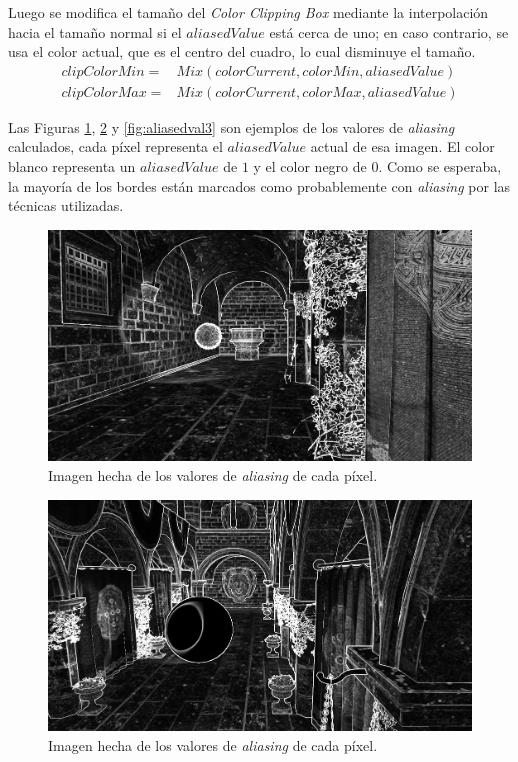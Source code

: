 \documentclass[pregrado]{tesis-usb} %
\begin{document}
Luego se modifica el tamaño del \textit{Color Clipping Box} mediante la interpolación hacia el tamaño normal si el $aliasedValue$ está cerca de uno; en caso contrario, se usa el color actual, que es el centro del cuadro, lo cual disminuye el tamaño.
\begin{equation}\label{eq:clipredux}
\begin{split}
	clipColorMin= & Mix(colorCurrent,colorMin,aliasedValue) \\
	clipColorMax= & Mix(colorCurrent,colorMax,aliasedValue)
\end{split}
\end{equation}



Las Figuras \ref{fig:aliasedval1}, \ref{fig:aliasedval2} y \ref{fig:aliasedval3} son ejemplos de los valores de \textit{aliasing} calculados, cada píxel representa el $aliasedValue$ actual de esa imagen. El color blanco representa un $aliasedValue$ de $1$ y el color negro de $0$. Como se esperaba, la mayoría de los bordes están marcados como probablemente con \textit{aliasing} por las técnicas utilizadas.

\begin{figure}[H]
	\centering
	\includegraphics[scale=0.2]{images/aliased_value_example_1_temporal.png}
	\caption{Imagen hecha de los valores de \textit{aliasing} de cada píxel.}\label{fig:aliasedval1}
\end{figure}

\begin{figure}[H]
	\centering
	\includegraphics[scale=0.2]{images/aliased_value_example_2_temporal.png}
	\caption{Imagen hecha de los valores de \textit{aliasing} de cada píxel.}\label{fig:aliasedval2}
\end{figure}
\end{document}
